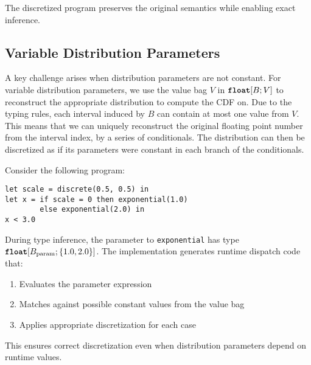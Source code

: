 The discretized program preserves the original semantics while enabling exact inference.

\subsection{Variable Distribution Parameters}

A key challenge arises when distribution parameters are not constant.
For variable distribution parameters, we use the value bag $V$ in $\textnormal{\ttfamily\bfseries float}[B; V]$ to reconstruct the appropriate distribution to compute the CDF on.
Due to the typing rules, each interval induced by $B$ can contain at most one value from $V$. This means that we can uniquely reconstruct the original floating point number from the interval index, by a series of conditionals.
The distribution can then be discretized as if its parameters were constant in each branch of the conditionals.

Consider the following program:
\begin{lstlisting}
let scale = discrete(0.5, 0.5) in
let x = if scale = 0 then exponential(1.0) 
        else exponential(2.0) in
x < 3.0
\end{lstlisting}

During type inference, the parameter to \texttt{exponential} has type $\textnormal{\ttfamily\bfseries float}[B_{\text{param}}; \{1.0, 2.0\}]$. The implementation generates runtime dispatch code that:
\begin{enumerate}
    \item Evaluates the parameter expression
    \item Matches against possible constant values from the value bag
    \item Applies appropriate discretization for each case
\end{enumerate}

This ensures correct discretization even when distribution parameters depend on runtime values.


